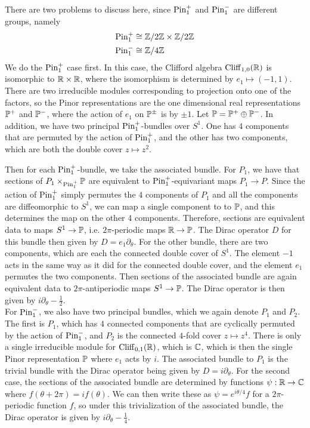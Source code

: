 \begin{exmp} %
There are two problems to discuss here, since $\Pin_1^+$ and $\Pin_1^-$ are
different groups, namely
\begin{align*}
\Pin_1^+ &\cong \Z/2\Z \times \Z / 2\Z \\
\Pin_1^- &\cong \Z/4\Z
\end{align*}
We do the $\Pin_1^+$ case first. In this case, the Clifford algebra
$\Cliff_{1,0}(\R)$ is isomorphic to $\R \times \R$, where the isomorphism is
determined by $e_1 \mapsto (-1,1)$. There are two irreducible modules corresponding
to projection onto one of the factors, so the Pinor representations are the one
dimensional real representations $\P^+$ and $\P^-$, where the action of $e_1$ on
$\P^\pm$ is by $\pm 1$. Let $\P = \P^+ \oplus \P^-$. In addition, we have two
principal $\Pin^+_1$-bundles over $S^1$. One has $4$ components that are permuted
by the action of $\Pin_1^+$, and the other has two components, which
are both the double cover $z \mapsto z^2$.

Then for each $\Pin_1^+$-bundle,
we take the associated bundle. For $P_1$, we have that sections of
$P_1 \times_{\Pin_1^+} \P$ are equivalent to $\Pin_1^+$-equivariant maps
$P_1 \to P$. Since the action of $\Pin_1^+$ simply permutes the $4$ components
of $P_1$ and all the components are diffeomorphic to $S^1$, we can map
a single component to to $\P$, and this determines the map on the other $4$
components. Therefore, sections are equivalent data to maps $S^1 \to \P$, i.e.
$2\pi$-periodic maps $\R \to \P$. The Dirac operator $D$ for this bundle then
given by $D = e_1\partial_\theta$. For the other bundle, there are two components,
which are each the connected double cover of $S^1$. The element $-1$ acts in the same
way as it did for the connected double cover, and the element $e_1$ permutes
the two components. Then sections of the associated bundle are again equivalent
data to $2\pi$-antiperiodic maps $S^1 \to \P$. The Dirac operator is then given
by $i\partial_\theta - \frac{1}{2}$. \\

For $\Pin_1^-$, we also have two principal bundles, which we again denote
$P_1$ and $P_2$. The first is $P_1$, which has $4$ connected components that are cyclically
permuted by the action of $\Pin_1^-$, and $P_2$ is the connected $4$-fold
cover $z \mapsto z^4$. There is only a single irreducible module for $\Cliff_{0,1}(\R)$,
which is $\C$, which is then the single Pinor representation $\P$ where
$e_1$ acts by $i$. The associated bundle to $P_1$ is the trivial bundle with the
Dirac operator being given by $D = i\partial_\theta$. For the second case,
the sections of the associated bundle are determined by functions
$\psi : \R \to \C$ where $f(\theta + 2\pi) = if(\theta)$. We can then write these
as $\psi = e^{i\theta/4}f$ for a $2\pi$-periodic function $f$, so under this
trivialization of the associated bundle, the Dirac operator is given by
$i\partial_\theta - \frac{1}{4}$.
\end{exmp}
%
